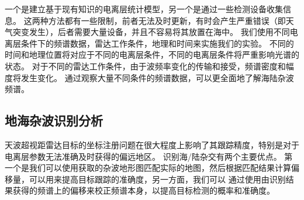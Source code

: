 一个是建立基于现有知识的电离层统计模型，另一个是通过一些检测设备收集信息。 这两种方法都有一些限制，前者无法及时更新，有时会产生严重错误（即天气突变发生），后者需要大量设备，并且不容易将其放置在海中。
我们使用不同电离层条件下的频谱数据，雷达工作条件，地理和时间来实施我们的实验。 不同的时间和地理位置将对应于不同的电离层条件，不同的电离层条件将严重影响光谱的状态。 对于不同的雷达工作条件，由于波频率变化的传输和接受，频谱密度和幅度将发生变化。 通过观察大量不同条件的频谱数据，可以更全面地了解海陆杂波频谱。
\subsection{地海杂波识别分析}
天波超视距雷达目标的坐标注册问题在很大程度上影响了其跟踪精度，特别是对于电离层参数无法准确及时获得的偏远地区。 识别海/陆杂交有两个主要优点。 第一个是我们可以使用获取的杂波地形图匹配实际的地图，然后根据匹配结果计算偏移量，可以用来提高目标跟踪的准确度，另一方面，我们可以 通过使用由识别结果获得的频谱上的偏移来校正频谱本身，以提高目标检测的概率和准确度。

